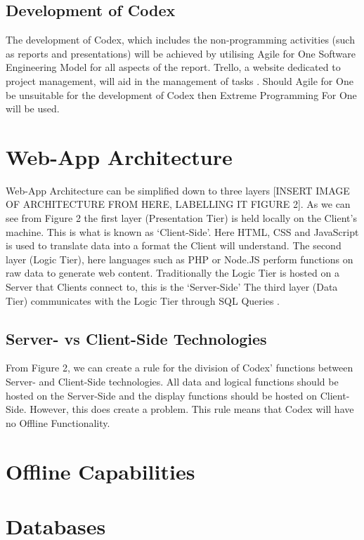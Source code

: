 \documentclass[review]{cmpreport}
\begin{document}
	\subsection{Development of Codex}
	The development of Codex, which includes the non-programming activities (such as reports and presentations) will be achieved by utilising Agile for One Software Engineering Model for all aspects of the report. Trello, a website dedicated to project management, will aid in the management of tasks \cite{Trello}. Should Agile for One be unsuitable for the development of Codex then Extreme Programming For One will be used. 
	
	\section{Web-App Architecture}
	Web-App Architecture can be simplified down to three layers [INSERT IMAGE OF ARCHITECTURE FROM \cite{SecurityWebApps} HERE, LABELLING IT FIGURE 2]. As we can see from Figure 2 the first layer (Presentation Tier) is held locally on the Client's machine. This is what is known as `Client-Side'. Here HTML, CSS and JavaScript is used to translate data into a format the Client will understand. The second layer (Logic Tier), here languages such as PHP or Node.JS perform functions on raw data to generate web content. Traditionally the Logic Tier is hosted on a Server that Clients connect to, this is the `Server-Side' The third layer (Data Tier) communicates with the Logic Tier through SQL Queries \cite{SecurityWebApps}.
	
	\subsection{Server- vs Client-Side Technologies}
	From Figure 2, we can create a rule for the division of Codex' functions between Server- and Client-Side technologies. All data and logical functions should be hosted on the Server-Side and the display functions should be hosted on Client-Side. However, this does create a problem. This rule means that Codex will have no Offline Functionality. 
	
	\section{Offline Capabilities}

	\section{Databases}
\end{document}
